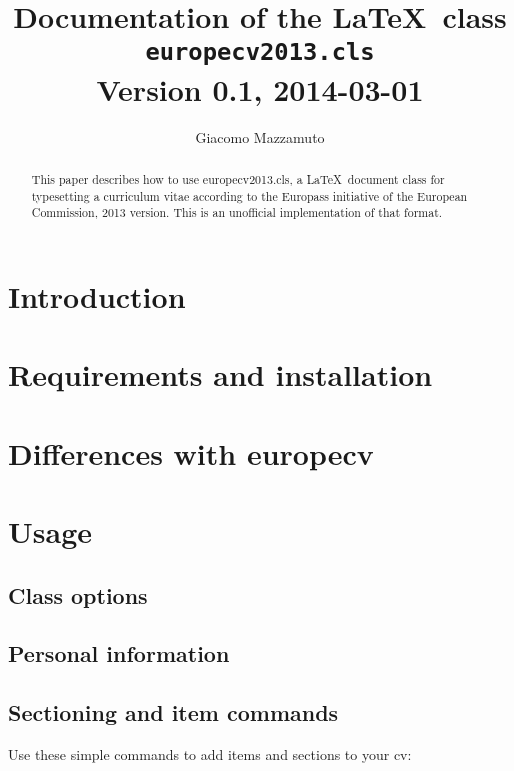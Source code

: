 \documentclass[a4paper,12pt,nodocument,nologo,notitle]{europecv2013}
\author{\small Giacomo Mazzamuto}
\title{\small Documentation of the \LaTeX\ class\\
		\Large \textbf{\texttt{europecv2013.cls}}\\
		\small \vspace{0.2cm} Version 0.1, 2014-03-01
}
\date{}
\begin{document}
\maketitle

\begin{abstract}
This paper describes how to use europecv2013.cls, a \LaTeX\ document class for typesetting a curriculum vitae according to the Europass initiative of the European Commission, 2013 version. This is an unofficial implementation of that format.

\end{abstract}

\section{Introduction}

\section{Requirements and installation}
\section{Differences with europecv}
\section{Usage}
\subsection{Class options}
\subsection{Personal information}

\begin{minipage}{20cm}
\begin{europecv}
\ecvpersonalinfo
\end{europecv}
\end{minipage}


\subsection{Sectioning and item commands}
Use these simple commands to add items and sections to your cv:\\
\begin{minipage}{\textwidth}
\begin{europecv}
\end{europecv}
\end{minipage}
\end{document}
